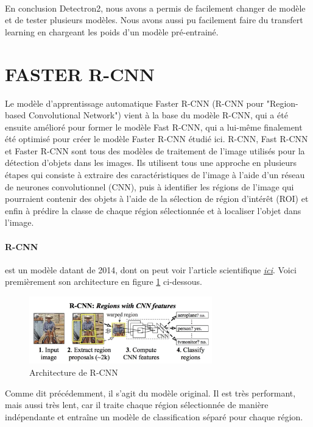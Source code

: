 \paragraph{}
En conclusion Detectron2, nous avons a permis de facilement changer de modèle et de tester plusieurs modèles. Nous avons aussi pu facilement faire du transfert learning en chargeant les poids d'un modèle pré-entrainé. 
\section{FASTER R-CNN}

Le modèle d'apprentissage automatique Faster R-CNN (R-CNN pour "Region-based Convolutional Network") vient à la base du modèle R-CNN, qui a été ensuite amélioré pour former le modèle Fast R-CNN, qui a lui-même finalement été optimisé pour créer le modèle Faster R-CNN étudié ici. R-CNN, Fast R-CNN et Faster R-CNN sont tous des modèles de traitement de l'image utilisés pour la détection d'objets dans les images. Ils utilisent tous une approche en plusieurs étapes qui consiste à extraire des caractéristiques de l'image à l'aide d'un réseau de neurones convolutionnel (CNN), puis à identifier les régions de l'image qui pourraient contenir des objets à l'aide de la sélection de région d'intérêt (ROI) et enfin à prédire la classe de chaque région sélectionnée et à localiser l'objet dans l'image.

\paragraph{R-CNN} est un modèle datant de 2014, dont on peut voir l'article scientifique \href{https://arxiv.org/pdf/1311.2524.pdf}{\textit{ici}}. Voici premièrement son architecture en figure \ref{fig:rcnn_architecture} ci-dessous.

\begin{figure}[H]
    \centering
    \includegraphics[width=300px]{images/model_rcnn_architecture.png}
    \caption{Architecture de R-CNN}
    \label{fig:rcnn_architecture}
\end{figure}

Comme dit précédemment, il s'agit du modèle original. Il est très performant, mais aussi très lent, car il traite chaque région sélectionnée de manière indépendante et entraîne un modèle de classification séparé pour chaque région.

